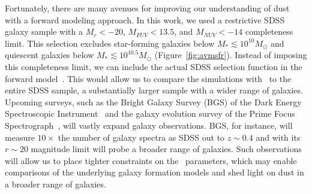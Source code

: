 Fortunately, there are many avenues for improving our understanding of dust
with a forward modeling approach. 
In this work, we used a restrictive SDSS galaxy sample with a $M_r < -20$,
$M_{FUV} < 13.5$, and $M_{NUV} < -14$ completeness limit. 
This selection excludes star-forming galaxies below $M_* \lesssim 10^{10}M_\odot$ and quiescent
galaxies below $M_* \lesssim 10^{10.5}M_\odot$ (Figure~\ref{fig:avmsfr}). 
Instead of imposing this completeness limit, we can include the actual SDSS
selection function in the forward 
model~\citep[\eg~][]{dickey2020}. 
This would allow us to compare the simulations with \eda~to the entire SDSS
sample, a substantially larger sample with a wider range of galaxies. 
Upcoming surveys, such as the Bright Galaxy Survey (BGS) of the Dark Energy
Spectroscopic Instrument~\citep[DESI;][]{desicollaboration2016, ruiz-macias2020} 
and the galaxy evolution survey of the Prime Focus
Spectrograph~\citep[PFS;][]{takada2014,tamura2016}, will vastly expand galaxy
observations. 
BGS, for instance, will measure $10\times$ the number of galaxy spectra as
SDSS out to $z\sim0.4$  and with its $r\sim20$ magnitude limit will probe
a broader range of galaxies.
Such observations will allow us to place tighter constraints on
the \eda~parameters, which may enable comparisons of the underlying galaxy
formation models and shed light on dust in a broader range of galaxies.
    
